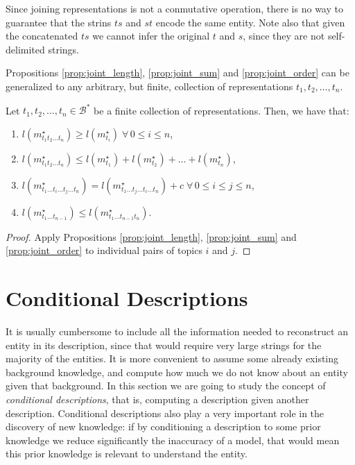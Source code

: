 Since joining representations is not a conmutative operation, there is no way to guarantee that the strins $ts$ and $st$ encode the same entity. Note also that given the concatenated $ts$ we cannot infer the original $t$ and $s$, since they are not self-delimited strings.

Propositions \ref{prop:joint_length}, \ref{prop:joint_sum} and \ref{prop:joint_order} can be generalized to any arbitrary, but finite, collection of representations $t_1, t_2, \ldots, t_n$.

\begin{proposition}
\label{prop:joint_multiple_topics}
Let $t_1, t_2, \ldots, t_n \in \mathcal{B}^\ast$ be a finite collection of representations. Then, we have that:

\renewcommand{\theenumi}{\roman{enumi}}
\begin{enumerate}
\item $l(m_{t_1 t_2 \ldots t_n}^\star) \geq l(m_ {t_i}^\star) \; \forall \, 0 \leq i \leq n$,
\item $l(m_{t_1 t_2 \ldots t_n}^\star) \leq l(m_ {t_1}^\star) + l(m_ {t_2}^\star) + \ldots + l(m_ {t_n}^\star)$,
\item $l(m_{t_1 \ldots t_i \ldots t_j \ldots t_n}^\star) = l(m_{t_1 \ldots t_j \ldots t_i \ldots t_n}^\star) + c \; \forall \, 0 \leq i \leq j \leq n$,
\item $l(m_{t_1 \ldots t_{n-1}}^\star) \leq l(m_{t_1 \ldots t_{n-1} t_n}^\star)$.
\end{enumerate}
\end{proposition}
\begin{proof}
Apply Propositions \ref{prop:joint_length}, \ref{prop:joint_sum} and \ref{prop:joint_order} to individual pairs of topics $i$ and $j$.
\end{proof}

%
%

\section{Conditional Descriptions}

It is usually cumbersome to include all the information needed to reconstruct an entity in its description, since that would require very large strings for the majority of the entities. It is more convenient to assume some already existing background knowledge, and compute how much we do not know about an entity given that background. In this section we are going to study the concept of \emph{conditional descriptions}, that is, computing a description given another description. Conditional descriptions also play a very important role in the discovery of new knowledge: if by conditioning a description to some prior knowledge we reduce significantly the inaccuracy of a model, that would mean this prior knowledge is relevant to understand the entity.

